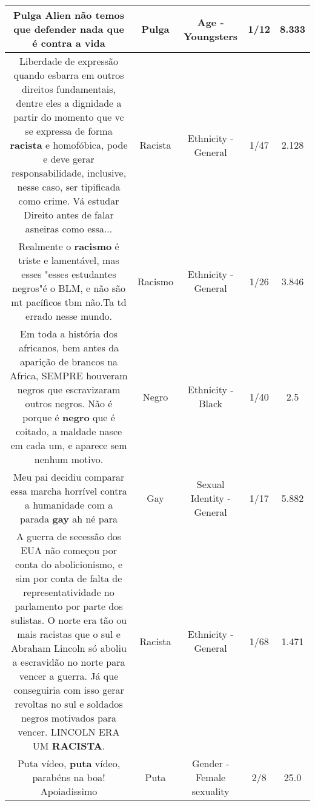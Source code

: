 \documentclass[11pt]{article}
\newlength\mylength
\begin{document}
\begin{center}
\begin{longtable}{|C{.65\mylength}|C{.30\mylength}|C{.12\mylength}|C{.12\mylength}|C{.12\mylength}|}
  \small Pulga Alien não temos que defender nada que é contra a vida\normalsize   & Pulga & Age - Youngsters & 1/12 & 8.333 \\  \hline
  \small Liberdade de expressão quando esbarra em outros direitos fundamentais, dentre eles a dignidade a partir do momento que vc se expressa de forma \textbf{racista} e homofóbica, pode e deve gerar responsabilidade, inclusive, nesse caso, ser tipificada como crime. Vá estudar Direito antes de falar asneiras como essa...\normalsize   & Racista & Ethnicity - General & 1/47 & 2.128 \\  \hline
  \small Realmente o \textbf{racismo} é triste e lamentável, mas esses "esses estudantes negros"é o BLM, e não são mt pacíficos tbm não.Ta td errado nesse mundo.\normalsize   & Racismo & Ethnicity - General & 1/26 & 3.846 \\  \hline
  \small Em toda a história dos africanos, bem antes da aparição de brancos na Africa, SEMPRE houveram negros que escravizaram outros negros. Não é porque é \textbf{negro} que é coitado, a maldade nasce em cada um, e aparece sem nenhum motivo.\normalsize   & Negro & Ethnicity - Black & 1/40 & 2.5 \\  \hline
  \small Meu pai decidiu comparar essa marcha horrível contra a humanidade com a parada \textbf{gay} ah né para\normalsize   & Gay & Sexual Identity - General & 1/17 & 5.882 \\  \hline
  \small A guerra de secessão dos EUA não começou por conta do abolicionismo, e sim por conta de falta de representatividade no parlamento por parte dos sulistas. O norte era tão ou mais racistas que o sul e Abraham Lincoln só aboliu a escravidão no norte para vencer a guerra. Já que conseguiria com isso gerar revoltas no sul e soldados negros motivados para vencer. LINCOLN ERA UM \textbf{RACISTA}.\normalsize   & Racista & Ethnicity - General & 1/68 & 1.471 \\  \hline
  \small Puta vídeo, \textbf{puta} vídeo, parabéns na boa! Apoiadissimo\normalsize   & Puta & Gender - Female sexuality & 2/8 & 25.0 \\  \hline

\end{longtable}
\end{center}
\end{document}
